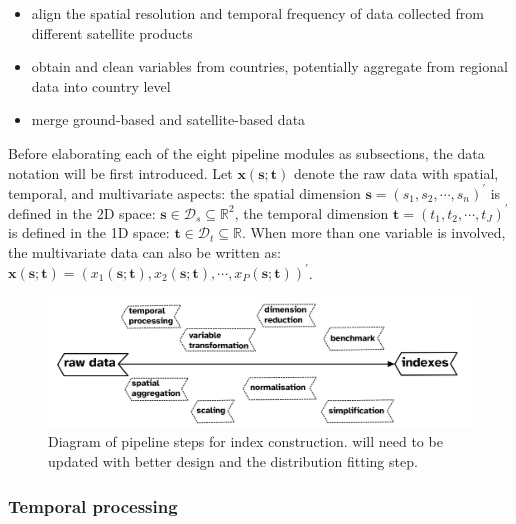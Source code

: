 \documentclass[
]{interact}
\providecommand{\tightlist}{%
  \setlength{\itemsep}{0pt}\setlength{\parskip}{0pt}}\usepackage{longtable,booktabs,array}
\begin{document}
\begin{itemize}
\tightlist
\item
  align the spatial resolution and temporal frequency of data collected
  from different satellite products
\item
  obtain and clean variables from countries, potentially aggregate from
  regional data into country level
\item
  merge ground-based and satellite-based data
\end{itemize}

Before elaborating each of the eight pipeline modules as subsections,
the data notation will be first introduced. Let
\(\mathbf{x}(\mathbf{s};\mathbf{t})\) denote the raw data with spatial,
temporal, and multivariate aspects: the spatial dimension
\(\mathbf{s} = (s_1, s_2, \cdots, s_n)^\prime\) is defined in the 2D
space: \(\mathbf{s} \in \mathcal{D}_s \subseteq \mathbb{R}^2\), the
temporal dimension \(\mathbf{t} = (t_1, t_2, \cdots, t_J)^\prime\) is
defined in the 1D space:
\(\mathbf{t} \in \mathcal{D}_t \subseteq \mathbb{R}\). When more than
one variable is involved, the multivariate data can also be written as:
\(\mathbf{x}(\mathbf{s}; \mathbf{t}) = (x_1(\mathbf{s}; \mathbf{t}), x_2(\mathbf{s}; \mathbf{t}), \cdots, x_P(\mathbf{s}; \mathbf{t}))^\prime\).

\begin{figure}

{\centering \includegraphics[width=1\textwidth,height=0.9\textheight]{figures/pipeline-steps.png}

}

\caption{\label{fig-pipeline-steps}Diagram of pipeline steps for index
construction. will need to be updated with better design and the
distribution fitting step.}

\end{figure}

\hypertarget{temporal-processing}{%
\subsubsection{Temporal processing}\label{temporal-processing}}
\end{document}
